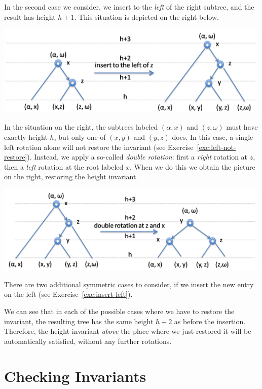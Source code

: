 In the second case we consider, we insert to the \emph{left} of the
right subtree, and the result has height $h+1$.  This situation is
depicted on the right below.
\begin{center}
  \includegraphics[width=0.99\textwidth]{img/avl8b.png}
\end{center}
In the situation on the right, the subtrees labeled $(\alpha, x)$ and
$(z, \omega)$ must have exactly height $h$, but only one of $(x,y)$
and $(y,z)$ does.  In this case, a single left rotation alone will not
restore the invariant (see Exercise~\ref{exc:left-not-restore}).
Instead, we apply a so-called \emph{double rotation}: first a
\emph{right} rotation at $z$, then a \emph{left} rotation at the root
labeled $x$.  When we do this we obtain the picture on the right,
restoring the height invariant.
\begin{center}
  \includegraphics[width=0.99\textwidth]{img/avl8.png}
  \label{dia:RL}
\end{center}
There are two additional symmetric cases to consider, if we insert
the new entry on the left (see Exercise~\ref{exc:insert-left}).

We can see that in each of the possible cases where we have to restore
the invariant, the resulting tree has the same height $h+2$ as before
the insertion.  Therefore, the height invariant \emph{above} the place
where we just restored it will be automatically satisfied, without any
further rotations.


\section{Checking Invariants}
\label{sec:avl:checkinvariant}

